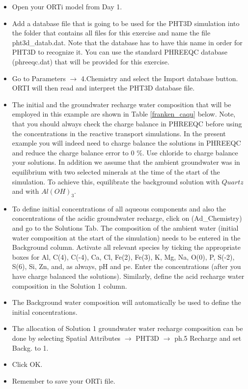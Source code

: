 \begin{itemize}

\item Open your ORTi model from Day 1. 

\item Add a database file that is going to be used for the PHT3D simulation into the folder that contains all files for this exercise and name the file {\color{blue}pht3d\_datab.dat}. Note that the database has to have this name in order for PHT3D to recognize it. You can use the standard PHREEQC database (phreeqc.dat) that will be provided for this exercise. 

\item Go to {\color{blue}Parameters} $\rightarrow$ {\color{blue}4.Chemistry} and select the
{\color{blue}Import database} button. ORTI will then read and interpret 
the PHT3D database file.

\item The initial and the groundwater recharge water composition that will be employed in this example are shown in Table \ref{franken_caqu} below. Note, that you should always check the charge balance in PHREEQC before using the concentrations in the reactive transport simulations. In the present example you will indeed need to charge balance the solutions in PHREEQC and reduce the charge balance error to 0 \%. Use chloride to charge balance your solutions.
In addition we assume that the ambient groundwater was in equilibrium 
with two selected minerals at the time of the start of the simulation.
To achieve this, equilibrate the background solution with $Quartz$ and with $Al(OH)_3$.

\item  To define initial concentrations of all aqueous components and also the concentrations of the acidic groundwater recharge, click on {\color{blue}(Ad\_Chemistry)} and go to the {\color{blue}Solutions} Tab. 
The composition of the ambient water (initial water composition at the start of the simulation) needs to be entered in the {\color{blue}Background} column. Activate all relevant species by ticking the appropriate boxes for Al, C(4), C(-4), Ca, Cl, Fe(2), Fe(3), K, Mg, Na, O(0), P, S(-2), S(6), Si, Zn, and, as always, pH and pe. 
Enter the concentrations (after you have charge balanced the solutions). 
Similarly, define the acid recharge water composition in the {\color{blue}Solution 1} column.

\item The Background water composition will automatically be used to define the initial concentrations.

\item The allocation of {\color{blue}Solution 1} groundwater water recharge composition 
can be done by selecting 
{\color{blue}Spatial Attributes} 
$\rightarrow$ {\color{blue}PHT3D} 
$\rightarrow$  {\color{blue}ph.5 Recharge} 
and set {\color{blue}Backg.} to 1. 

\item Click OK.

\item Remember to save your ORTi file.

\end{itemize}

